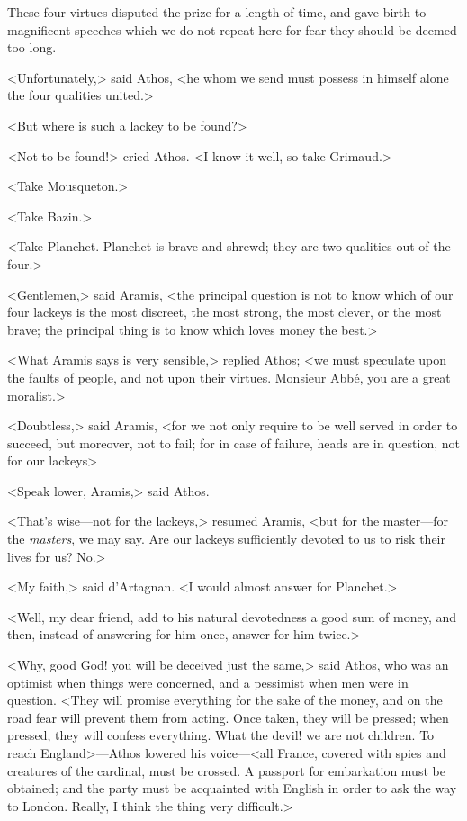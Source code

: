 These four virtues disputed the prize for a length of time, and gave birth to magnificent speeches which we do not repeat here for fear they should be deemed too long. 

<Unfortunately,> said Athos, <he whom we send must possess in himself alone the four qualities united.> 

<But where is such a lackey to be found?> 

<Not to be found!> cried Athos. <I know it well, so take Grimaud.> 

<Take Mousqueton.> 

<Take Bazin.> 

<Take Planchet. Planchet is brave and shrewd; they are two qualities out of the four.> 

<Gentlemen,> said Aramis, <the principal question is not to know which of our four lackeys is the most discreet, the most strong, the most clever, or the most brave; the principal thing is to know which loves money the best.> 

<What Aramis says is very sensible,> replied Athos; <we must speculate upon the faults of people, and not upon their virtues. Monsieur Abbé, you are a great moralist.> 

<Doubtless,> said Aramis, <for we not only require to be well served in order to succeed, but moreover, not to fail; for in case of failure, heads are in question, not for our lackeys\longdash> 

<Speak lower, Aramis,> said Athos. 

<That's wise---not for the lackeys,> resumed Aramis, <but for the master---for the \textit{masters}, we may say. Are our lackeys sufficiently devoted to us to risk their lives for us? No.> 

<My faith,> said d'Artagnan. <I would almost answer for Planchet.> 

<Well, my dear friend, add to his natural devotedness a good sum of money, and then, instead of answering for him once, answer for him twice.> 

<Why, good God! you will be deceived just the same,> said Athos, who was an optimist when things were concerned, and a pessimist when men were in question. <They will promise everything for the sake of the money, and on the road fear will prevent them from acting. Once taken, they will be pressed; when pressed, they will confess everything. What the devil! we are not children. To reach England>---Athos lowered his voice---<all France, covered with spies and creatures of the cardinal, must be crossed. A passport for embarkation must be obtained; and the party must be acquainted with English in order to ask the way to London. Really, I think the thing very difficult.> 

